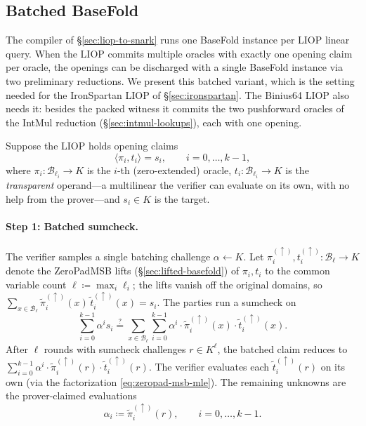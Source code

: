 \documentclass{article}
\theoremstyle{definition}
\newcommand*{\mle}{\widetilde}
\newcommand{\BB}{\mathcal{B}}
\begin{document}
\subsection{Batched BaseFold}
\label{sec:batched-basefold}

The compiler of \S\ref{sec:liop-to-snark} runs one BaseFold instance per LIOP linear query. When the LIOP commits multiple oracles with exactly one opening claim per oracle, the openings can be discharged with a single BaseFold instance via two preliminary reductions. We present this batched variant, which is the setting needed for the IronSpartan LIOP of \S\ref{sec:ironspartan}. The Binius64 LIOP also needs it: besides the packed witness it commits the two pushforward oracles of the IntMul reduction (\S\ref{sec:intmul-lookups}), each with one opening.

Suppose the LIOP holds opening claims
\[
  \langle \pi_i, t_i \rangle = s_i, \qquad i = 0, \ldots, k - 1,
\]
where $\pi_i \colon \BB_{\ell_i} \to K$ is the $i$-th (zero-extended) oracle, $t_i \colon \BB_{\ell_i} \to K$ is the \emph{transparent} operand---a multilinear the verifier can evaluate on its own, with no help from the prover---and $s_i \in K$ is the target.

\paragraph{Step 1: Batched sumcheck.}
The verifier samples a single batching challenge $\alpha \gets K$. Let $\pi_i^{(\uparrow)}, t_i^{(\uparrow)} \colon \BB_{\boldsymbol{\ell}} \to K$ denote the ZeroPadMSB lifts (\S\ref{sec:lifted-basefold}) of $\pi_i, t_i$ to the common variable count $\boldsymbol{\ell} \coloneqq \max_i \ell_i$; the lifts vanish off the original domains, so $\sum_{x \in \BB_{\boldsymbol{\ell}}} \mle{\pi}_i^{(\uparrow)}(x)\, \mle{t}_i^{(\uparrow)}(x) = s_i$. The parties run a sumcheck on
\[
  \sum_{i = 0}^{k - 1} \alpha^i s_i \stackrel{?}{=} \sum_{x \in \BB_{\boldsymbol{\ell}}} \sum_{i = 0}^{k - 1} \alpha^i \cdot \mle{\pi}_i^{(\uparrow)}(x) \cdot \mle{t}_i^{(\uparrow)}(x).
\]
After $\boldsymbol{\ell}$ rounds with sumcheck challenges $r \in K^{\boldsymbol{\ell}}$, the batched claim reduces to $\sum_{i = 0}^{k - 1} \alpha^i \cdot \mle{\pi}_i^{(\uparrow)}(r) \cdot \mle{t}_i^{(\uparrow)}(r)$. The verifier evaluates each $\mle{t}_i^{(\uparrow)}(r)$ on its own (via the factorization \eqref{eq:zeropad-msb-mle}). The remaining unknowns are the prover-claimed evaluations
\[
  \alpha_i \coloneqq \mle{\pi}_i^{(\uparrow)}(r), \qquad i = 0, \ldots, k - 1.
\]
\end{document}
